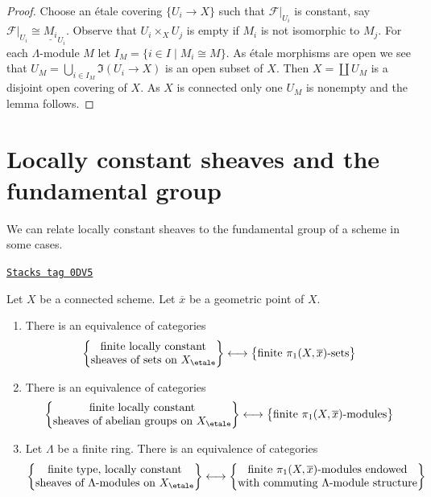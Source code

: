 \begin{proof}
Choose an \'etale covering
$\{U_i \to X\}$ such that $\mathcal{F}|_{U_i}$ is constant, say
$\mathcal{F}|_{U_i} \cong \underline{M_i}_{U_i}$.
Observe that $U_i \times_X U_j$ is empty if $M_i$ is not isomorphic
to $M_j$.
For each $\Lambda$-module $M$ let $I_M = \{i \in I \mid M_i \cong M\}$.
As \'etale morphisms are open we see that
$U_M = \bigcup_{i \in I_M} \Im(U_i \to X)$
is an open subset of $X$. Then $X = \coprod U_M$ is a disjoint
open covering of $X$. As $X$ is connected only one $U_M$ is nonempty
and the lemma follows.
\end{proof}

\section{Locally constant sheaves and the fundamental group}
\label{etale-cohomology-section-pione}
We can relate locally constant sheaves to the fundamental group
of a scheme in some cases.

\begin{lemma}
\label{etale-cohomology-lemma-locally-constant-on-connected}
\href{https://stacks.math.columbia.edu/tag/0DV5}{\texttt{Stacks tag 0DV5}}

Let $X$ be a connected scheme. Let $\overline{x}$ be a geometric point of $X$.
\begin{enumerate}
\item There is an equivalence of categories
$$
\left\{
\begin{matrix}
\text{finite locally constant}\\
\text{sheaves of sets on }X_\etale
\end{matrix}
\right\}
\longleftrightarrow
\left\{
\begin{matrix}
\text{finite }\pi_1(X, \overline{x})\text{-sets}
\end{matrix}
\right\}
$$
\item There is an equivalence of categories
$$
\left\{
\begin{matrix}
\text{finite locally constant}\\
\text{sheaves of abelian groups on }X_\etale
\end{matrix}
\right\}
\longleftrightarrow
\left\{
\begin{matrix}
\text{finite }\pi_1(X, \overline{x})\text{-modules}
\end{matrix}
\right\}
$$
\item Let $\Lambda$ be a finite ring. There is an equivalence of categories
$$
\left\{
\begin{matrix}
\text{finite type, locally constant}\\
\text{sheaves of }\Lambda\text{-modules on }X_\etale
\end{matrix}
\right\}
\longleftrightarrow
\left\{
\begin{matrix}
\text{finite }\pi_1(X, \overline{x})\text{-modules endowed}\\
\text{with commuting }\Lambda\text{-module structure}
\end{matrix}
\right\}
$$
\end{enumerate}
\end{lemma}

